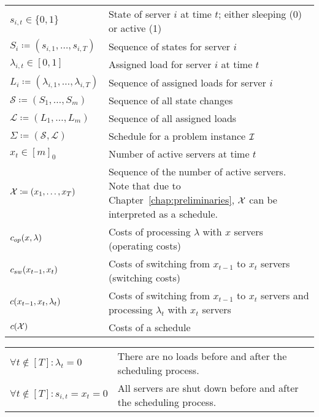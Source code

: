 \begin{table}[H]
\begin{tabularx}{\textwidth}{ | >{\centering\arraybackslash}X | >{\arraybackslash}m{} | }
  \hline \multicolumn{2}{|c|}{\textbf{\large Problem Statement}} \\  
  \hline $s_{i,t}\in\{0,1\}$& State of server $i$ at time $t$; either sleeping (0) or active (1)\\
  \hline $S_i\coloneqq(s_{i,1},\dotsc,s_{i,T})$& Sequence of states for server $i$\\
  \hline $\lambda_{i,t}\in[0,1]$& Assigned load for server $i$ at time $t$\\
  \hline $L_i\coloneqq(\lambda_{i,1},\dotsc,\lambda_{i,T})$& Sequence of assigned loads for server $i$\\
  \hline $\mathcal{S}\coloneqq(S_1,\dotsc,S_m)$& Sequence of all state changes\\
  \hline $\mathcal{L}\coloneqq(L_1,\dotsc,L_m)$& Sequence of all assigned loads\\
  \hline $\Sigma\coloneqq(\mathcal{S},\mathcal{L})$& Schedule for a problem instance $\mathcal{I}$\\
  \hline $x_t\in[m]_0$& Number of active servers at time $t$\\
  \hline $\mathcal{X}\coloneqq(x_1,\ldots,x_T)$& Sequence of the number of active servers. Note that due to Chapter~\ref{chap:preliminaries}, $\mathcal{X}$ can be interpreted as a schedule.\\
  \hline $c_{op}(x,\lambda)$& Costs of processing $\lambda$ with $x$ servers (operating costs)\\
  \hline $c_{sw}(x_{t-1},x_{t})$& Costs of switching from $x_{t-1}$ to $x_t$ servers (switching costs)\\
  \hline $c(x_{t-1},x_{t},\lambda_t)$& Costs of switching from $x_{t-1}$ to $x_t$ servers and processing $\lambda_t$ with $x_t$ servers\\
  \hline $c(\mathcal{X})$& Costs of a schedule\\
  \hline
\end{tabularx}
\end{table}

\begin{table}[H]
\begin{tabularx}{\textwidth}{ | >{\centering\arraybackslash}X | >{\arraybackslash}m{} | }
  \hline \multicolumn{2}{|c|}{\textbf{\large Conventions}} \\  
  \hline $\forall t\notin[T]:\lambda_t=0$ & There are no loads before and after the scheduling process.\\  
  \hline $\forall t\notin[T]:s_{i,t}=x_t=0$ & All servers are shut down before and after the scheduling process.\\  
  \hline
\end{tabularx}
\end{table}

